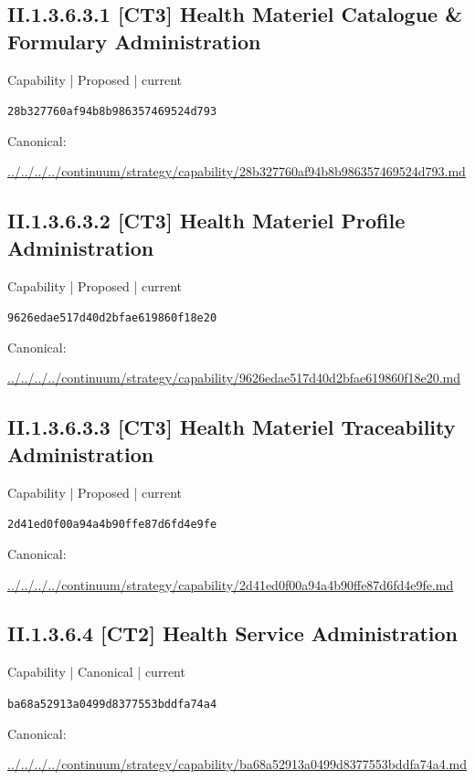 \documentclass[10pt,a4paper]{article}
\begin{document}
\subsection*{II.1.3.6.3.1 [CT3] Health Materiel Catalogue \& Formulary Administration}
{\small Capability | Proposed | current}\par
\texttt{28b327760af94b8b986357469524d793}\par
Canonical: \par
{\footnotesize\url{../../../../continuum/strategy/capability/28b327760af94b8b986357469524d793.md}}\par
\subsection*{II.1.3.6.3.2 [CT3] Health Materiel Profile Administration}
{\small Capability | Proposed | current}\par
\texttt{9626edae517d40d2bfae619860f18e20}\par
Canonical: \par
{\footnotesize\url{../../../../continuum/strategy/capability/9626edae517d40d2bfae619860f18e20.md}}\par
\subsection*{II.1.3.6.3.3 [CT3] Health Materiel Traceability Administration}
{\small Capability | Proposed | current}\par
\texttt{2d41ed0f00a94a4b90ffe87d6fd4e9fe}\par
Canonical: \par
{\footnotesize\url{../../../../continuum/strategy/capability/2d41ed0f00a94a4b90ffe87d6fd4e9fe.md}}\par
\subsection*{II.1.3.6.4 [CT2] Health Service Administration}
{\small Capability | Canonical | current}\par
\texttt{ba68a52913a0499d8377553bddfa74a4}\par
Canonical: \par
{\footnotesize\url{../../../../continuum/strategy/capability/ba68a52913a0499d8377553bddfa74a4.md}}\par
\end{document}
